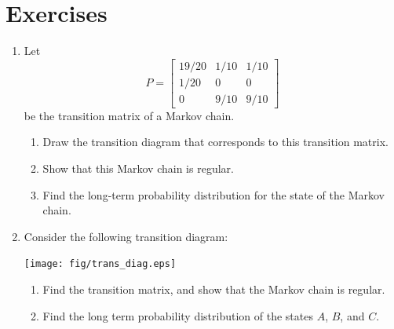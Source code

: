 \documentclass[reqno]{immbook}
\numberwithin{equation}{chapter}
\numberwithin{question}{section}
\numberwithin{theorem}{chapter}
\numberwithin{figure}{chapter}
\theoremstyle{definition}
\begin{document}
\section{Exercises}
\label{sec:exercises_markov}
\begin{enumerate}
\item
\label{ex:markov1}
Let
\begin{equation}
  P = \begin{bmatrix}
           19/20 & 1/10 & 1/10 \\
	   1/20 & 0   & 0   \\
	   0    & 9/10 & 9/10
      \end{bmatrix}
\end{equation}
be the transition matrix of a Markov chain.
\begin{enumerate}
\item
Draw the transition diagram that corresponds to this transition matrix.
\item
Show that this Markov chain is regular.
\item
Find the long-term probability distribution for the state of the Markov
chain.
\end{enumerate}

\item
\label{ex:markov2}
Consider the following transition diagram:

\medskip
\centerline{%
\texttt{[image: fig/trans\_diag.eps]}
}
\begin{enumerate}
\item Find the transition matrix,
and show that the Markov chain is regular.
\item  Find the long term probability distribution of the states
$A$, $B$, and $C$.
\end{enumerate}



\end{enumerate}
\end{document}
